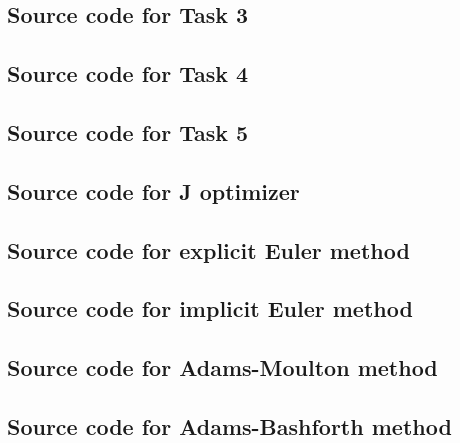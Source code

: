 \documentclass[11pt]{article}
\begin{document}
\subsection{Source code for Task 3}

\newpage
\subsection{Source code for Task 4}

\newpage
\subsection{Source code for Task 5}

\newpage
\subsection{Source code for J optimizer}

\newpage
\subsection{Source code for explicit Euler method}

\newpage
\subsection{Source code for implicit Euler method}

\newpage
\subsection{Source code for Adams-Moulton method}

\newpage
\subsection{Source code for Adams-Bashforth method}

\end{document}
